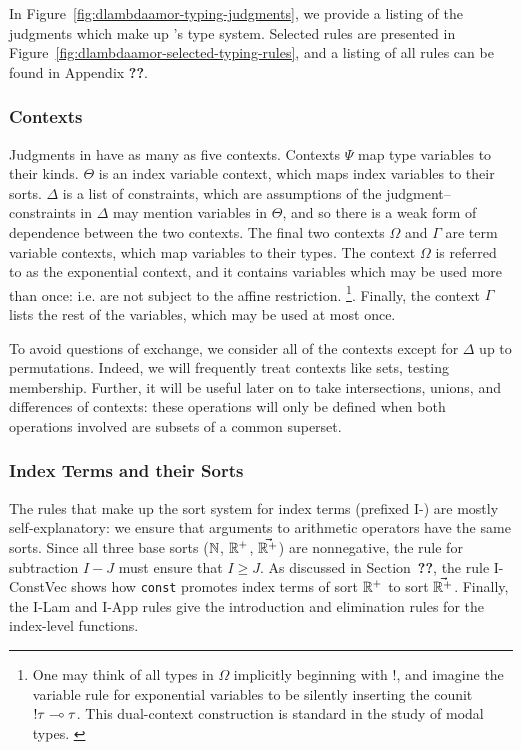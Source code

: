In Figure~\ref{fig:dlambdaamor-typing-judgments}, we provide a listing of the judgments which make up \dlambdaamor's type system. Selected rules are presented in Figure~\ref{fig:dlambdaamor-selected-typing-rules}, and a listing of all rules can be found in Appendix \textbf{??}.

\subsubsection{Contexts}
Judgments in \dlambdaamor have as many as five contexts.
 Contexts $\Psi$ map type variables to their kinds. $\Theta$ is an index variable context, which maps index variables to their sorts. $\Delta$ is a list of constraints, which are assumptions of the judgment-- constraints in $\Delta$ may mention variables in $\Theta$, and so there is a weak form of dependence between the two contexts. The final two contexts $\Omega$ and $\Gamma$ are term variable contexts, which map variables to their types. The context $\Omega$ is referred to as the exponential context, and it contains variables which may be used more than once: i.e. are not subject to the affine restriction.
\footnote{
One may think of all types in $\Omega$ implicitly beginning with $!$, and imagine the variable rule for exponential variables to be silently inserting the counit $!\tau \multimap \tau$. This dual-context construction is standard in the study of modal types. \cite{kavvos:lmcs}
}. Finally, the context $\Gamma$ lists the rest of the variables, which may be used at most once.

To avoid questions of exchange, we consider all of the contexts except for $\Delta$ up to permutations. Indeed, we will frequently treat contexts like sets, testing membership. Further, it will be useful later on to take intersections, unions, and differences of contexts: these operations will only be defined when both operations involved are subsets of a common superset.

\subsubsection{Index Terms and their Sorts}
The rules that make up the sort system for index terms (prefixed I-) are mostly self-explanatory: we ensure that arguments to arithmetic operators have the same sorts.
Since all three base sorts ($\mathbb{N}$, $\mathbb{R}^+$, $\vec{\mathbb{R}^+}$) are nonnegative, the rule for subtraction $I - J$ must ensure that $I \geq J$. As discussed in Section~\textbf{??}, the rule I-ConstVec shows how \texttt{const} promotes index terms of sort $\mathbb{R}^+$ to sort $\vec{\mathbb{R}^+}$. Finally, the I-Lam and I-App rules give the introduction and elimination rules for the index-level functions.

